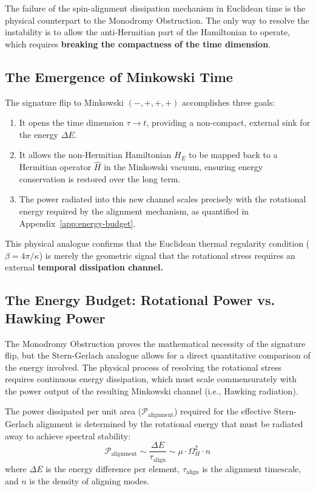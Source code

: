 \documentclass[11pt]{article}
\begin{document}
The failure of the spin-alignment dissipation mechanism in Euclidean time is the physical counterpart to the Monodromy Obstruction. The only way to resolve the instability is to allow the anti-Hermitian part of the Hamiltonian to operate, which requires \textbf{breaking the compactness of the time dimension}.

\subsection{The Emergence of Minkowski Time}

The signature flip to Minkowski $(-,+,+,+)$ accomplishes three goals:
\begin{enumerate}
    \item It opens the time dimension $\tau \to t$, providing a non-compact, external sink for the energy $\Delta E$.
    \item It allows the non-Hermitian Hamiltonian $H_E$ to be mapped back to a Hermitian operator $\widehat{H}$ in the Minkowski vacuum, ensuring energy conservation is restored over the long term.
    \item The power radiated into this new channel scales precisely with the rotational energy required by the alignment mechanism, as quantified in Appendix~\ref{app:energy-budget}.
\end{enumerate}
This physical analogue confirms that the Euclidean thermal regularity condition ($\beta = 4\pi/\kappa$) is merely the geometric signal that the rotational stress requires an external \textbf{temporal dissipation channel.}

\subsection{The Energy Budget: Rotational Power vs. Hawking Power}

The Monodromy Obstruction proves the mathematical necessity of the signature flip, but the Stern-Gerlach\cite{SternGerlach1922} analogue allows for a direct quantitative comparison of the energy involved. The physical process of resolving the rotational stress requires continuous energy dissipation, which must scale commensurately with the power output of the resulting Minkowski channel (i.e., Hawking radiation\cite{Hawking1975}).

The power dissipated per unit area ($\mathcal{P}_{\text{alignment}}$) required for the effective Stern-Gerlach\cite{SternGerlach1922} alignment is determined by the rotational energy that must be radiated away to achieve spectral stability:
\begin{equation}
    \mathcal{P}_{\text{alignment}} \sim \frac{\Delta E}{\tau_{\text{align}}} \sim \mu \cdot \Omega_H^2 \cdot n
\end{equation}
where $\Delta E$ is the energy difference per element, $\tau_{\text{align}}$ is the alignment timescale, and $n$ is the density of aligning modes.
\end{document}
